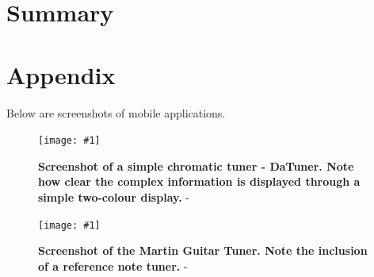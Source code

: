 \documentclass[conference]{acmsiggraph}
\newcommand{\figuremacroW}[4]{
	\begin{figure}[h] %
		\centering
		\texttt{[image: \#1]}
		\caption[#2]{\textbf{#2} - #3}
		\label{fig:#1}
	\end{figure}
}
\begin{document}
\section{Summary}








\section{Appendix}

Below are screenshots of mobile applications.

\figuremacroW
{daTune}
{Screenshot of a simple chromatic tuner - DaTuner. Note how clear the complex information is displayed through a simple two-colour display.}
{\protect\cite{DaTune}}
{1.0}

\figuremacroW
{martinTuner}
{Screenshot of the Martin Guitar Tuner. Note the inclusion of a reference note tuner.}
{\protect\cite{Martin}}
{1.0}
\end{document}
